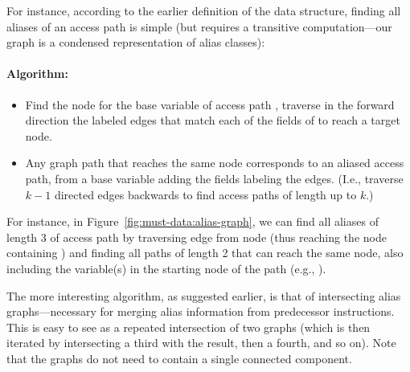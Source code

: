 For instance, according to the earlier definition of the data structure, finding all aliases of an access path is simple (but requires a transitive computation---our graph is a condensed representation of alias classes):


\paragraph{Algorithm: }
\begin{itemize}
\item Find the node for the base variable of access path , traverse in the forward direction the labeled edges that match each of the fields of  to reach a target node.

\item Any graph path that reaches the same node corresponds to an aliased access path, from a base variable adding the fields labeling the edges. (I.e., traverse $k-1$ directed edges backwards to find access paths of length up to $k$.)
\end{itemize}

For instance, in Figure~\ref{fig:must-data:alias-graph}, we can find all aliases of length 3 of access path  by traversing edge  from node  (thus reaching the node containing ) and finding all paths of length 2 that can reach the same node, also including the variable(s) in the starting node of the path (e.g., ).

The more interesting algorithm, as suggested earlier, is that of intersecting alias graphs---necessary for merging alias information from predecessor instructions. This is easy to see as a repeated intersection of two graphs (which is then iterated by intersecting a third with the result, then a fourth, and so on). Note that the graphs do not need to contain a single connected component.


